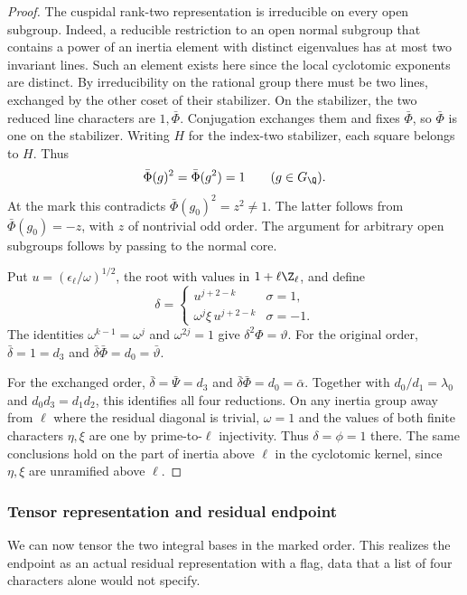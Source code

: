 \begin{proof}
The cuspidal rank-two representation is irreducible
on every open subgroup. Indeed, a reducible
restriction to an open normal subgroup that contains
a power of an inertia element with distinct eigenvalues
has at most two invariant lines. Such an element
exists here since the local cyclotomic exponents are
distinct. By irreducibility on the rational group
there must be two lines, exchanged by the other
coset of their stabilizer. On the stabilizer,
the two reduced line characters are \(1,\bar\Phi\).
Conjugation exchanges them and fixes \(\bar\Phi\),
so \(\bar\Phi\) is one on the stabilizer. Writing \(H\) for the index-two stabilizer, each square belongs to \(H\). Thus
\[
 \bar\Phi(g)^2=\bar\Phi(g^2)=1\qquad(g\in G_\Q).
\] At the mark this contradicts
\(\bar\Phi(g_0)^2=z^2\ne1\). The latter follows from
\(\bar\Phi(g_0)=-z\), with \(z\) of nontrivial odd
order. The argument for arbitrary open subgroups
follows by passing to the normal core.

Put \(u=(\epsilon_\ell/\omega)^{1/2}\), the root with
values in \(1+\ell\Z_\ell\), and define
\[
 \delta =
 \begin{cases}
 u^{j+2-k} & \sigma=1,\\
 \omega^j\xi\,u^{j+2-k} & \sigma=-1 .
 \end{cases}
\]
The identities \(\omega^{k-1}=\omega^j\) and
\(\omega^{2j}=1\) give
\(\delta^2\Phi=\vartheta\).
For the original order, \(\bar\delta=1=d_3\) and
\(\bar\delta\bar\Phi=d_0=\bar\vartheta\).

For the exchanged order, \(\bar\delta=\bar\Psi=d_3\)
and \(\bar\delta\bar\Phi=d_0=\bar\alpha\).
Together with \(d_0/d_1=\lambda_0\) and
\(d_0d_3=d_1d_2\), this identifies all four reductions.
On any inertia group away from \(\ell\) where the
residual diagonal is trivial, \(\omega=1\) and the
values of both finite characters \(\eta,\xi\) are
one by prime-to-\(\ell\) injectivity. Thus
\(\delta=\phi=1\) there.
The same conclusions hold on the part of inertia
above \(\ell\) in the cyclotomic kernel, since
\(\eta,\xi\) are unramified above \(\ell\).

\end{proof}

\subsubsection{Tensor representation and residual endpoint}

We can now tensor the two integral bases in the marked order. This realizes the endpoint as an actual residual representation with a flag, data that a list of four characters alone would not specify.

